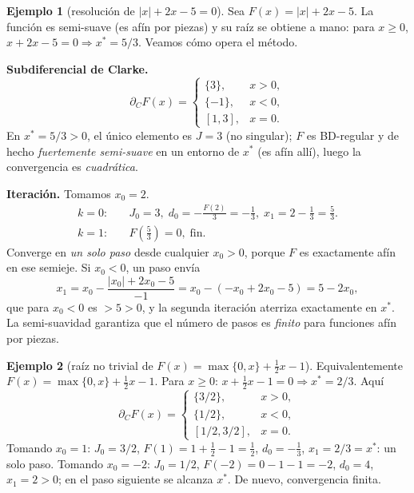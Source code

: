 \documentclass[12pt]{book}
\newcommand{\subdiff}{\partial}
\theoremstyle{definition}
\newtheorem{ejemplo}{Ejemplo}[section]
\theoremstyle{plain}
\theoremstyle{remark}
\begin{document}
\begin{ejemplo}[resolución de $|x|+2x-5=0$]
  Sea $F(x)=|x|+2x-5$.  La función es semi-suave (es afín por
  piezas) y su raíz se obtiene a mano: para $x\ge0$,
  $x+2x-5=0\Rightarrow x^*=5/3$.  Veamos cómo opera el método.

  \medskip
  \textbf{Subdiferencial de Clarke.}
  \[
    \subdiff_C F(x)=
    \begin{cases}
      \{3\},       & x>0,\\
      \{-1\},      & x<0,\\
      [1,3],       & x=0.
    \end{cases}
  \]
  En $x^*=5/3>0$, el único elemento es $J=3$ (no singular);
  $F$ es BD-regular y de hecho \emph{fuertemente semi-suave} en un
  entorno de $x^*$ (es afín allí), luego la convergencia es
  \emph{cuadrática}.

  \medskip
  \textbf{Iteración.}  Tomamos $x_0=2$.
  \begin{align*}
    k=0:&\quad J_0=3,\;
          d_0=-\tfrac{F(2)}{3}=-\tfrac{1}{3},\;
          x_1=2-\tfrac13=\tfrac53.\\
    k=1:&\quad F(\tfrac53)=0,\;\text{fin.}
  \end{align*}
  Converge en \emph{un solo paso} desde cualquier $x_0>0$, porque
  $F$ es exactamente afín en ese semieje.  Si $x_0<0$, un paso
  envía
  \[
    x_1=x_0-\frac{|x_0|+2x_0-5}{-1}=x_0-(-x_0+2x_0-5)=5-2x_0,
  \]
  que para $x_0<0$ es $>5>0$, y la segunda iteración aterriza
  exactamente en $x^*$.  La semi-suavidad garantiza que el número
  de pasos es \emph{finito} para funciones afín por piezas.
\end{ejemplo}

\begin{ejemplo}[raíz no trivial de $F(x)=\max\{0,x\}+\tfrac12 x-1$]
  Equivalentemente
  $F(x)=\max\{0,x\}+\tfrac12 x-1$.  Para $x\ge0$:
  $x+\tfrac12 x-1=0\Rightarrow x^*=2/3$.  Aquí
  \[
    \subdiff_C F(x)=
    \begin{cases}
      \{3/2\},      & x>0,\\
      \{1/2\},      & x<0,\\
      [1/2,3/2],    & x=0.
    \end{cases}
  \]
  Tomando $x_0=1$:
  $J_0=3/2$, $F(1)=1+\tfrac12-1=\tfrac12$, $d_0=-\tfrac13$,
  $x_1=2/3=x^*$: un solo paso.  Tomando $x_0=-2$:
  $J_0=1/2$, $F(-2)=0-1-1=-2$, $d_0=4$, $x_1=2>0$; en el paso
  siguiente se alcanza $x^*$.  De nuevo, convergencia finita.
\end{ejemplo}
\end{document}
